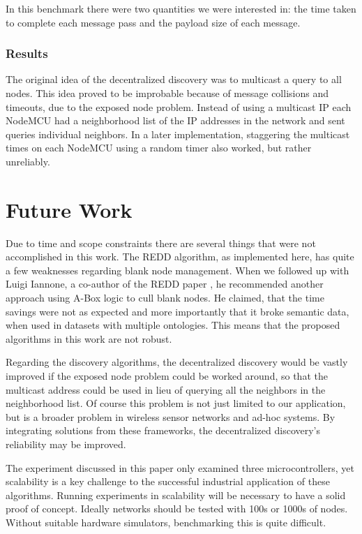 In this benchmark there were two quantities we were interested in: the time taken to complete each message pass and the payload size of each message.


\subsubsection{Results}
The original idea of the decentralized discovery was to multicast a query to all nodes. This idea proved to be improbable because of message collisions and timeouts, due to the exposed node problem.  Instead of using a multicast IP each NodeMCU had a neighborhood list of the IP addresses in the network and sent queries individual neighbors. In a later implementation, staggering the multicast times on each NodeMCU using a random timer also worked, but rather unreliably. 


\section{Future Work}

Due to time and scope constraints there are several things that were not accomplished in this work. The REDD algorithm, as implemented here, has quite a few weaknesses regarding blank node management. When we followed up with Luigi Iannone, a co-author of the REDD paper \cite{Esposito.2005}, he recommended another approach using A-Box logic to cull blank nodes. He claimed, that the time savings were not as expected and more importantly that it broke semantic data, when used in datasets with multiple ontologies. This means that the proposed algorithms in this work are not robust.

Regarding the discovery algorithms, the decentralized discovery would be vastly improved if the exposed node problem could be worked around, so that the multicast address could be used in lieu of querying all the neighbors in the neighborhood list. Of course this problem is not just limited to our application, but is a broader problem in wireless sensor networks and ad-hoc systems. By integrating solutions from these frameworks, the decentralized discovery's reliability may be improved. 

The experiment discussed in this paper only examined three microcontrollers, yet scalability is a key challenge to the successful industrial application of these algorithms. Running experiments in scalability will be necessary to have a solid proof of concept. Ideally networks should be tested with 100s or 1000s of nodes. Without suitable hardware simulators, benchmarking this is quite difficult.

